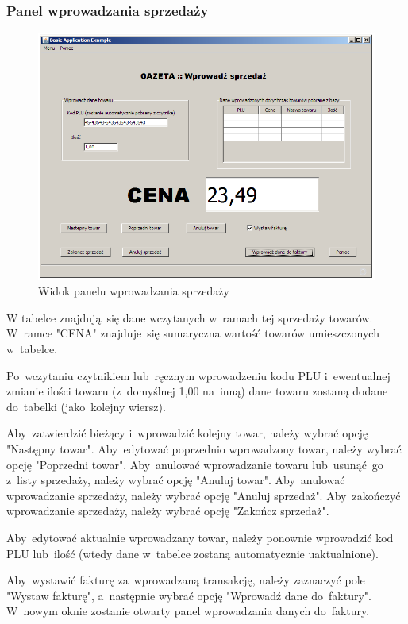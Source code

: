 \subsubsection{Panel wprowadzania sprzedaży}
\begin{figure}
\includegraphics[width=1\textwidth]{gfx/sprzedaz.png}
\caption{Widok panelu wprowadzania sprzedaży}
\end{figure}
W tabelce znajdują~się dane wczytanych w~ramach tej sprzedaży towarów. W~ramce "CENA" znajduje~się sumaryczna wartość towarów umieszczonych w~tabelce.

Po~wczytaniu czytnikiem lub~ręcznym wprowadzeniu kodu PLU i~ewentualnej zmianie ilości towaru (z~domyślnej 1,00 na~inną) dane towaru zostaną dodane do~tabelki (jako~kolejny wiersz).

Aby~zatwierdzić bieżący i~wprowadzić kolejny towar, należy wybrać opcję "Następny towar". Aby~edytować poprzednio wprowadzony towar, należy wybrać opcję "Poprzedni towar". Aby~anulować wprowadzanie towaru lub~usunąć~go z~listy sprzedaży, należy wybrać opcję "Anuluj towar". Aby~anulować wprowadzanie sprzedaży, należy wybrać opcję "Anuluj sprzedaż". Aby~zakończyć wprowadzanie sprzedaży, należy wybrać opcję "Zakończ sprzedaż".

Aby~edytować aktualnie wprowadzany towar, należy ponownie wprowadzić kod PLU lub~ilość (wtedy dane w~tabelce zostaną automatycznie uaktualnione).

Aby~wystawić fakturę za~wprowadzaną transakcję, należy zaznaczyć pole "Wystaw fakturę", a~następnie wybrać opcję "Wprowadź dane do~faktury". W~nowym oknie zostanie otwarty panel wprowadzania danych do~faktury.
